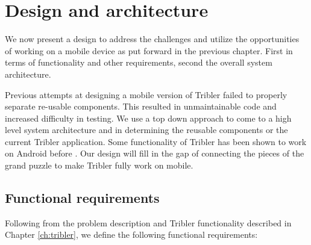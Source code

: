 \chapter{Design and architecture}\label{ch:design}

We now present a design to address the challenges and utilize the opportunities of working on a mobile device as put forward in the previous chapter.
First in terms of functionality and other requirements, second the overall system architecture.

Previous attempts at designing a mobile version of Tribler failed to properly separate re-usable components.
This resulted in unmaintainable code and increased difficulty in testing.
We use a top down approach to come to a high level system architecture and in determining the reusable components or the current Tribler application.
Some functionality of Tribler has been shown to work on Android before \cite{tribler2014play,tribler2014at3,tribler-anon-hd}.
Our design will fill in the gap of connecting the pieces of the grand puzzle to make Tribler fully work on mobile.


\section{Functional requirements}\label{sec:func_req}

Following from the problem description and Tribler functionality described in Chapter \ref{ch:tribler}, we define the following functional requirements:


